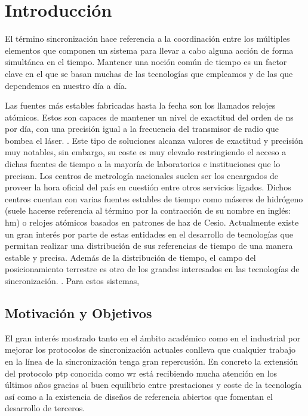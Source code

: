 \chapter{Introducción}

El término sincronización hace referencia a la coordinación entre los múltiples 
elementos que componen un sistema para llevar a cabo alguna acción de forma 
simultánea en el tiempo. Mantener una noción común de tiempo es un factor clave 
en el que se basan muchas de las tecnologías que empleamos y de las que 
dependemos en nuestro día a día.

 Las 
fuentes más estables fabricadas hasta la fecha son los llamados relojes
atómicos. 
 Estos son capaces de mantener un nivel de exactitud del 
orden de \gls{ns} por día, con una precisión igual a la frecuencia del
transmisor de radio que bombea el láser.  . Este tipo de 
soluciones alcanza valores de exactitud y precisión muy notables, sin embargo, 
su coste es muy elevado restringiendo el acceso a dichas fuentes de tiempo a la 
mayoría de laboratorios e instituciones que lo precisan. Los centros de 
metrología nacionales suelen ser los encargados de proveer la hora oficial del 
país en cuestión entre otros servicios ligados. Dichos centros cuentan con 
varias fuentes estables de tiempo como máseres de hidrógeno (suele
hacerse referencia al término por la contracción de su nombre en inglés: 
\acrshort{hm}) o relojes atómicos basados en patrones de haz de Cesio. 
Actualmente existe un gran interés por parte de estas entidades en el 
desarrollo de tecnologías que permitan realizar una distribución de sus 
referencias de tiempo de una manera estable y precisa.
Además de la distribución de tiempo, el campo del posicionamiento terrestre es 
otro de los grandes interesados en las tecnologías de sincronización. 
. Para estos sistemas, 

\section{Motivación y Objetivos}

El gran interés mostrado tanto en el ámbito académico como en el industrial por 
mejorar los protocolos de sincronización actuales conlleva que cualquier 
trabajo en la línea de la sincronización tenga gran repercusión. En concreto la 
extensión del protocolo \gls{ptp} conocida como \gls{wr} está recibiendo mucha 
atención en los últimos años gracias al buen equilibrio entre prestaciones y 
coste de la tecnología así como a la existencia de diseños de referencia 
abiertos que fomentan el desarrollo de terceros.

